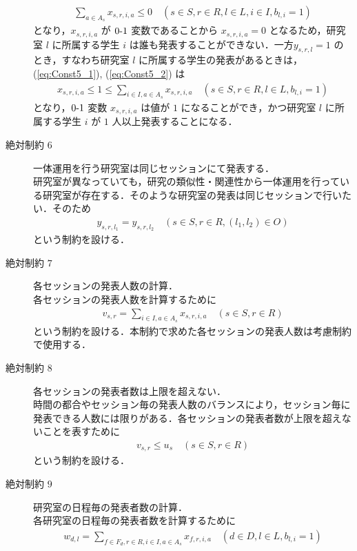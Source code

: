 \documentclass[a4paper,12pt,fleqn]{jarticle}
\begin{document}
\begin{description}
  \begin{eqnarray*}
   \sum_{a \in A_s} x_{s,r,i,a} \leq 0 \quad (s \in S, r \in R, l \in L, i \in I, b_{l,i} = 1)
  \end{eqnarray*}
  となり，$x_{s,r,i,a}$ が $0\mathchar`-1$ 変数であることから $x_{s,r,i,a} = 0$ となるため，研究室 $l$ に所属する学生 $i$ は誰も発表することができない．一方$y_{s,r,l}=1$ のとき，すなわち研究室 $l$ に所属する学生の発表があるときは，(\ref{eq:Const5_1}), (\ref{eq:Const5_2}) は
  \begin{eqnarray*}
    x_{s,r,i,a} \leq 1 \leq \sum_{i \in I, a \in A_s} x_{s,r,i,a} \quad (s \in S, r \in R, l \in L, b_{l,i} = 1)
  \end{eqnarray*}
  となり，$0\mathchar`-1$ 変数 $x_{s,r,i,a}$ は値が $1$ になることができ，かつ研究室 $l$ に所属する学生 $i$ が $1$ 人以上発表することになる．
\item[絶対制約 $6$] 一体運用を行う研究室は同じセッションにて発表する．\\研究室が異なっていても，研究の類似性・関連性から一体運用を行っている研究室が存在する．そのような研究室の発表は同じセッションで行いたい．そのため
  \begin{eqnarray}
    y_{s,r,l_1} = y_{s,r,l_2} \quad(s \in S, r \in R, (l_1, l_2) \in O)
  \end{eqnarray}
  という制約を設ける．
\item[絶対制約 $7$] 各セッションの発表人数の計算．\\各セッションの発表人数を計算するために
  \begin{eqnarray}
    v_{s,r} = \sum_{i \in I, a \in A_s} x_{s,r,i,a} \quad (s \in S, r \in R)
  \end{eqnarray}
  という制約を設ける．本制約で求めた各セッションの発表人数は考慮制約で使用する．
\item[絶対制約 $8$] 各セッションの発表者数は上限を超えない．\\時間の都合やセッション毎の発表人数のバランスにより，セッション毎に発表できる人数には限りがある．各セッションの発表者数が上限を超えないことを表すために
  \begin{eqnarray}
    v_{s,r} \leq u_{s} \quad (s \in S, r \in R)
  \end{eqnarray}
  という制約を設ける．
\item[絶対制約 $9$] 研究室の日程毎の発表者数の計算．\\各研究室の日程毎の発表者数を計算するために
  \begin{eqnarray}
    w_{d,l} = \sum_{f \in F_d, r \in R, i \in I, a \in A_s} x_{f,r,i,a} \quad (d \in D, l \in L, b_{l,i} = 1) \label{eq:Const9}

\end{eqnarray}
\end{description}
\end{document}

